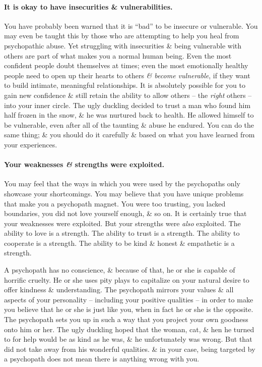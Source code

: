 \documentclass{article}
\numberwithin{equation}{section}
\begin{document}
\paragraph{It is okay to have insecurities \& vulnerabilities.} You have probably been warned that it is ``bad'' to be insecure or vulnerable. You may even be taught this by those who are attempting to help you heal from psychopathic abuse. Yet struggling with insecurities \& being vulnerable with others are part of what makes you a normal human being. Even the most confident people doubt themselves at times; even the most emotionally healthy people need to open up their hearts to others \textit{\& become vulnerable}, if they want to build intimate, meaningful relationships. It is absolutely possible for you to gain new confidence \& still retain the ability to allow others -- the \textit{right} others -- into your inner circle. The ugly duckling decided to trust a man who found him half frozen in the snow, \& he was nurtured back to health. He allowed himself to be vulnerable, even after all of the taunting \& abuse he endured. You can do the same thing; \& you should do it carefully \& based on what you have learned from your experiences.

\paragraph{Your weaknesses \textit{\&} strengths were exploited.} You may feel that the ways in which you were used by the psychopaths only showcase your shortcomings. You may believe that you have unique problems that make you a psychopath magnet. You were too trusting, you lacked boundaries, you did not love yourself enough, \& so on. It is certainly true that your weaknesses were exploited. But your strengths were \textit{also} exploited. The ability to love is a strength. The ability to trust is a strength. The ability to cooperate is a strength. The ability to be kind \& honest \& empathetic is a strength.
	
A psychopath has no conscience, \& because of that, he or she is capable of horrific cruelty. He or she uses pity plays to capitalize on your natural desire to offer kindness \& understanding. The psychopath mirrors your values \& all aspects of your personality -- including your positive qualities -- in order to make you believe that he or she is just like you, when in fact he or she is the opposite. The psychopath sets you up in such a way  that you project your own goodness onto him or her. The ugly duckling hoped that the woman, cat, \& hen he turned to for help would be as kind as he was, \& he unfortunately was wrong. But that did not take away from his wonderful qualities. \& in your case, being targeted by a psychopath does not mean there is anything wrong with you.
\end{document}
